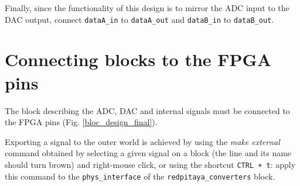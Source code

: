 \documentclass[10pt,oneside]{article}
\begin{document}
Finally, since the functionality of this design is to mirror the ADC input to the DAC output,
connect {\tt dataA\_in} to {\tt dataA\_out} and {\tt dataB\_in} to {\tt dataB\_out}.

\section{Connecting blocks to the FPGA pins}

The block describing the ADC, DAC and internal signals must be connected
to the FPGA pins (Fig. \ref{bloc_design_final}).

Exporting a signal to the outer world is achieved by using the {\em make external} command
obtained by selecting a given signal on a block (the line and its name should turn brown) 
and right-mouse click, or using the shortcut {\tt CTRL + t}: apply this command to the
{\tt phys\_interface} of the {\tt redpitaya\_converters} block.

\end{document}
